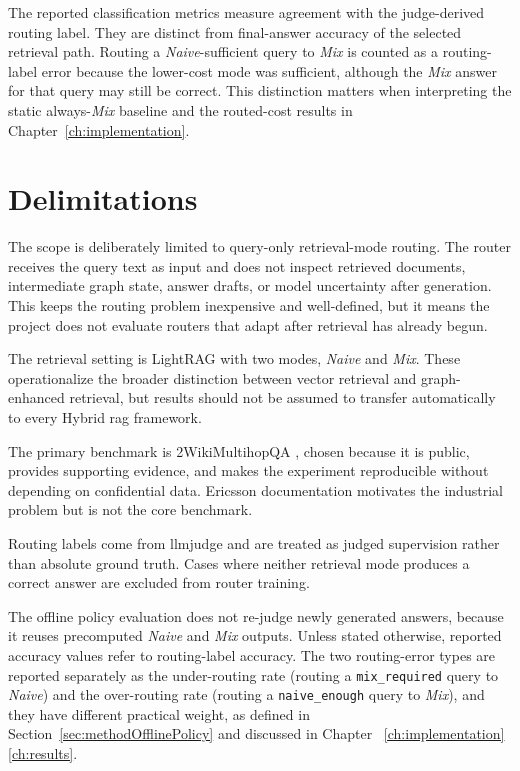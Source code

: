 \documentclass[english, bibtex]{kththesis}               %
\numberwithin{listing}{chapter}
\providecommand{\DIFaddtex}[1]{{\protect\color{blue} \sf #1}} %
\providecommand{\DIFdeltex}[1]{{\protect\color{red} \scriptsize #1}} %
\providecommand{\DIFaddbegin}{} %
\providecommand{\DIFaddend}{} %
\providecommand{\DIFdelbegin}{} %
\providecommand{\DIFdelend}{} %
\providecommand{\DIFadd}[1]{\texorpdfstring{\DIFaddtex{#1}}{#1}} %
\providecommand{\DIFdel}[1]{\texorpdfstring{\DIFdeltex{#1}}{}} %
\begin{document}
\DIFdel{The reported classification metrics measure agreement with the judge-derived routing label. They are distinct from final-answer accuracy of the selected retrieval path. Routing a \emph{Naive}-sufficient query to \emph{Mix} is counted as a routing-label error because the lower-cost mode was sufficient, although the \emph{Mix} answer for that query may still be correct. This distinction matters when interpreting the static always-\emph{Mix} baseline and the routed-cost results in Chapter~\ref{ch:implementation}.
}%

\DIFdelend \section{Delimitations}
\label{sec:delimitations}
\label{sec:researchMethodology}

The scope is deliberately limited to query-only retrieval-mode routing. The router receives the query text as input and does not inspect retrieved documents, intermediate graph state, answer drafts, or model uncertainty after generation. This keeps the routing problem inexpensive and well-defined, but it means the project does not evaluate routers that adapt after retrieval has already begun.

The retrieval setting is LightRAG with two modes, \emph{Naive} and \emph{Mix}. These operationalize the broader distinction between vector retrieval and graph-enhanced retrieval, but results should not be assumed to transfer automatically to every Hybrid \gls{rag} framework.

The primary benchmark is 2WikiMultihopQA \cite{ho2020twowiki}, chosen because it is public, provides supporting evidence, and makes the experiment reproducible without depending on confidential data. Ericsson documentation motivates the industrial problem but is not the core benchmark.

Routing labels come from \gls{llmjudge} and are treated as judged supervision rather than absolute ground truth. Cases where neither retrieval mode produces a correct answer are excluded from router training.

The offline policy evaluation does not re-judge newly generated answers, because it reuses precomputed \emph{Naive} and \emph{Mix} outputs. Unless stated otherwise, reported accuracy values refer to routing-label accuracy. The two routing-error types are reported separately as the under-routing rate (routing a \texttt{mix\_required} query to \emph{Naive}) and the over-routing rate (routing a \texttt{naive\_enough} query to \emph{Mix}), and they have different practical weight, as \DIFaddbegin \DIFadd{defined in Section~\ref{sec:methodOfflinePolicy} and }\DIFaddend discussed in Chapter~\DIFdelbegin \DIFdel{\ref{ch:implementation}}\DIFdelend \DIFaddbegin \DIFadd{\ref{ch:results}}\DIFaddend .
\end{document}

